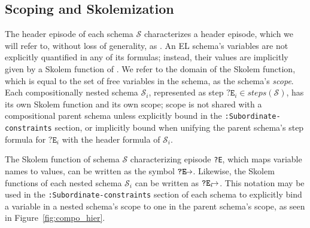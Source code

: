 \subsection{Scoping and Skolemization}
\label{sec:scoping}
The header episode of each schema $\mathcal{S}$ characterizes a header episode, which we will refer to, without loss of generality, as . An EL schema's variables are not explicitly quantified in any of its formulas; instead, their values are implicitly given by a Skolem function of . We refer to the domain of the Skolem function, which is equal to the set of free variables in the schema, as the schema's \textit{scope}. Each compositionally nested schema $\mathcal{S}_{i}$, represented as step $\texttt{?E}_{i} \in steps(\mathcal{S})$, has its own Skolem function and its own scope; scope is not shared with a compositional parent schema unless explicitly bound in the \texttt{:Subordinate-constraints} section, or implicitly bound when unifying the parent schema's step formula for $\texttt{?E}_{i}$ with the header formula of $\mathcal{S}_{i}$.

The Skolem function of schema $\mathcal{S}$ characterizing episode \texttt{?E}, which maps variable names to values, can be written as the symbol $\texttt{?E}\hspace{-2mm}\rightarrow$. Likewise, the Skolem functions of each nested schema $\mathcal{S}_{i}$ can be written as $\texttt{?E}_{i}\hspace{-2mm}\rightarrow$. This notation may be used in the \texttt{:Subordinate-constraints} section of each schema to explicitly bind a variable in a nested schema's scope to one in the parent schema's scope, as seen in Figure~\ref{fig:compo_hier}.